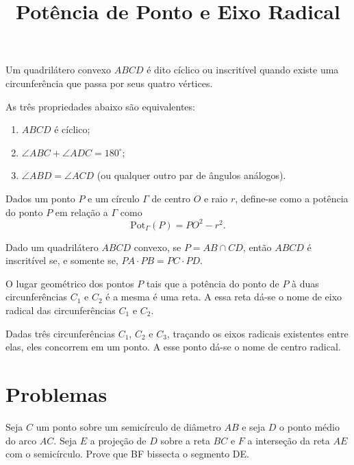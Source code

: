 \documentclass[final, 10pt, a4paper]{article}
\title{Potência de Ponto e Eixo Radical}
\author{}
\newcommand\Pot{\mathrm{Pot}}
\begin{document}
	
	\zeustitle

	\begin{defn}
	Um quadrilátero convexo $ABCD$ é dito cíclico ou inscritível quando existe uma circunferência que passa por seus quatro vértices.
	\end{defn}

	\begin{thm} As três propriedades abaixo são equivalentes:
		\begin{enumerate}[label = {\arabic*.}]
			\item $ABCD$ é cíclico;
			\item $\angle ABC + \angle ADC = 180^\circ$;
			\item $\angle ABD = \angle ACD$ (ou qualquer outro par de ângulos análogos).
		\end{enumerate}
	\end{thm}

	\begin{defn}
		Dados um ponto $P$ e um círculo $\Gamma$ de centro $O$ e raio $r$, define-se como a potência do ponto $P$ em relação a $\Gamma$ como \[ \Pot_\Gamma(P) = PO^2 - r^2.\]
	\end{defn}
	
	\begin{thm}
		Dado um quadrilátero $ABCD$ convexo, se $P = AB \cap CD$, então $ABCD$ é inscritível se, e somente se, $PA \cdot PB = PC \cdot PD$.
	\end{thm}

	\begin{thm}
		O lugar geométrico dos pontos $P$ tais que a potência do ponto de $P$ à duas circunferências $C_1$ e $C_2$ é a mesma é uma reta. A essa reta dá-se o nome de eixo radical das circunferências $C_1$ e $C_2$.
	\end{thm}
	
	\begin{thm}
		Dadas três circunferências $C_1$, $C_2$ e $C_3$, traçando os eixos radicais existentes entre elas, eles concorrem em um ponto. A esse ponto dá-se o nome de centro radical.
	\end{thm}

	\section{Problemas}

	\begin{prob}
		Seja $C$ um ponto sobre um semicírculo de diâmetro $AB$ e seja $D$ o ponto médio do arco $AC$. Seja $E$ a projeção de $D$ sobre a reta $BC$ e $F$ a interseção da reta $AE$ com o semicírculo. 	Prove que BF bissecta o segmento DE.
	\end{prob}
\end{document}
